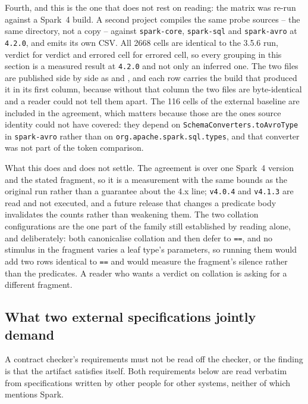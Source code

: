Fourth, and this is the one that does not rest on reading: the matrix was re-run against a Spark~4 build. A second project compiles the same probe sources -- the same directory, not a copy -- against \texttt{spark-core}, \texttt{spark-sql} and \texttt{spark-avro} at \texttt{4.2.0}, and emits its own CSV. All 2668 cells are identical to the 3.5.6 run, verdict for verdict and errored cell for errored cell, so every grouping in this section is a measured result at \texttt{4.2.0} and not only an inferred one. The two files are published side by side as  and , and each row carries the build that produced it in its first column, because without that column the two files are byte-identical and a reader could not tell them apart. The 116 cells of the external baseline are included in the agreement, which matters because those are the ones source identity could not have covered: they depend on \texttt{SchemaConverters.toAvroType} in \texttt{spark-avro} rather than on \texttt{org.apache.spark.sql.types}, and that converter was not part of the token comparison.

What this does and does not settle. The agreement is over one Spark~4 version and the stated fragment, so it is a measurement with the same bounds as the original run rather than a guarantee about the 4.x line; \texttt{v4.0.4} and \texttt{v4.1.3} are read and not executed, and a future release that changes a predicate body invalidates the counts rather than weakening them. The two collation configurations are the one part of the family still established by reading alone, and deliberately: both canonicalise collation and then defer to \texttt{==}, and no stimulus in the fragment varies a leaf type's parameters, so running them would add two rows identical to \texttt{==} and would measure the fragment's silence rather than the predicates. A reader who wants a verdict on collation is asking for a different fragment.

\subsection{What two external specifications jointly demand}
\label{sec:requirements}

A contract checker's requirements must not be read off the checker, or the finding is that the artifact satisfies itself. Both requirements below are read verbatim from specifications written by other people for other systems, neither of which mentions Spark.

